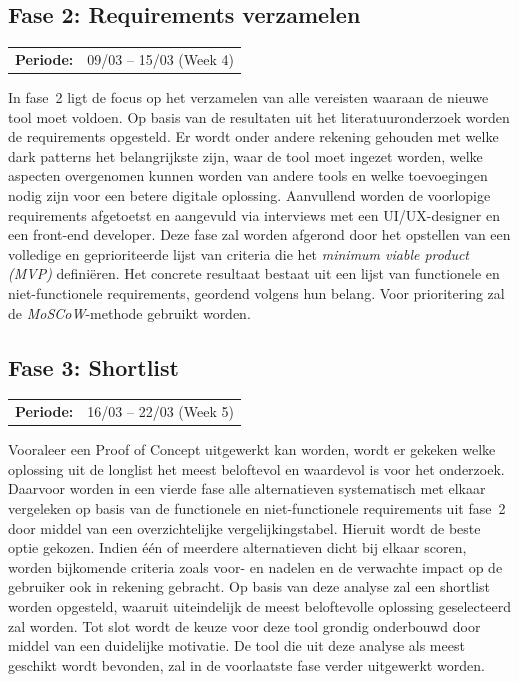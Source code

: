 \vspace{1em}

\subsection{Fase 2: Requirements verzamelen}
\label{subsec:requirements-verzamelen}

\begin{tabular}{ll}
    \hspace{0.3em} \textbf{Periode:} & 09/03 – 15/03 (Week 4)
\end{tabular}

\vspace{1em}

In fase~2 ligt de focus op het verzamelen van alle vereisten waaraan de nieuwe tool moet voldoen. Op basis van de resultaten uit het literatuuronderzoek worden de requirements opgesteld. Er wordt onder andere rekening gehouden met welke dark patterns het belangrijkste zijn, waar de tool moet ingezet worden, welke aspecten overgenomen kunnen worden van andere tools en welke toevoegingen nodig zijn voor een betere digitale oplossing. Aanvullend worden de voorlopige requirements afgetoetst en aangevuld via interviews met een UI/UX-designer en een front-end developer. Deze fase zal worden afgerond door het opstellen van een volledige en geprioriteerde lijst van criteria die het \emph{minimum viable product (MVP)} definiëren. Het concrete resultaat bestaat uit een lijst van functionele en niet-functionele requirements, geordend volgens hun belang. Voor prioritering zal de \emph{MoSCoW}-methode gebruikt worden.

\vspace{1em}

\subsection{Fase 3: Shortlist}
\label{subsec:shortlist}

\begin{tabular}{ll}
    \hspace{0.3em} \textbf{Periode:} & 16/03 – 22/03 (Week 5)
\end{tabular}

\vspace{1em}

Vooraleer een Proof of Concept uitgewerkt kan worden, wordt er gekeken welke oplossing uit de longlist het meest beloftevol en waardevol is voor het onderzoek. Daarvoor worden in een vierde fase alle alternatieven systematisch met elkaar vergeleken op basis van de functionele en niet-functionele requirements uit fase~2 door middel van een overzichtelijke vergelijkingstabel. Hieruit wordt de beste optie gekozen. Indien één of meerdere alternatieven dicht bij elkaar scoren, worden bijkomende criteria zoals voor- en nadelen en de verwachte impact op de gebruiker ook in rekening gebracht. Op basis van deze analyse zal een shortlist worden opgesteld, waaruit uiteindelijk de meest beloftevolle oplossing geselecteerd zal worden. Tot slot wordt de keuze voor deze tool grondig onderbouwd door middel van een duidelijke motivatie. De tool die uit deze analyse als meest geschikt wordt bevonden, zal in de voorlaatste fase verder uitgewerkt worden.

